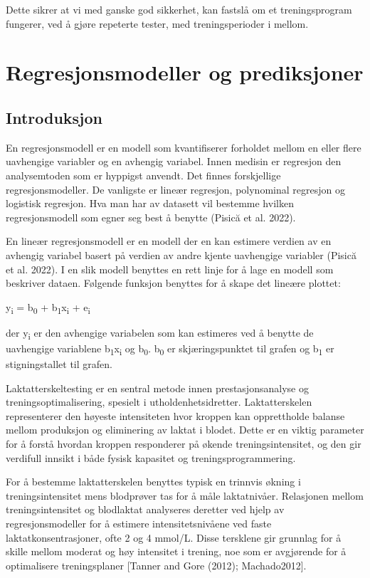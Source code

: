 \documentclass[
  letterpaper,
  DIV=11,
  numbers=noendperiod]{scrreprt}
\begin{document}
Dette sikrer at vi med ganske god sikkerhet, kan fastslå om et
treningsprogram fungerer, ved å gjøre repeterte tester, med
treningsperioder i mellom.


\chapter{Regresjonsmodeller og
prediksjoner}\label{regresjonsmodeller-og-prediksjoner}

\section{Introduksjon}\label{introduksjon-1}

En regresjonsmodell er en modell som kvantifiserer forholdet mellom en
eller flere uavhengige variabler og en avhengig variabel. Innen medisin
er regresjon den analysemtoden som er hyppigst anvendt. Det finnes
forskjellige regresjonsmodeller. De vanligste er lineær regresjon,
polynominal regresjon og logistisk regresjon. Hva man har av datasett
vil bestemme hvilken regresjonsmodell som egner seg best å benytte
(Pisică et al. 2022).

En lineær regresjonsmodell er en modell der en kan estimere verdien av
en avhengig variabel basert på verdien av andre kjente uavhengige
variabler (Pisică et al. 2022). I en slik modell benyttes en rett linje
for å lage en modell som beskriver dataen. Følgende funksjon benyttes
for å skape det lineære plottet:

y\textsubscript{i} = b\textsubscript{0} +
b\textsubscript{1}x\textsubscript{i} + e\textsubscript{i}

der y\textsubscript{i} er den avhengige variabelen som kan estimeres ved
å benytte de uavhengige variablene b\textsubscript{1}x\textsubscript{i}
og b\textsubscript{0}. b\textsubscript{0} er skjæringspunktet til grafen
og b\textsubscript{1} er stigningstallet til grafen.

Laktatterskeltesting er en sentral metode innen prestasjonsanalyse og
treningsoptimalisering, spesielt i utholdenhetsidretter. Laktatterskelen
representerer den høyeste intensiteten hvor kroppen kan opprettholde
balanse mellom produksjon og eliminering av laktat i blodet. Dette er en
viktig parameter for å forstå hvordan kroppen responderer på økende
treningsintensitet, og den gir verdifull innsikt i både fysisk kapasitet
og treningsprogrammering.

For å bestemme laktatterskelen benyttes typisk en trinnvis økning i
treningsintensitet mens blodprøver tas for å måle laktatnivåer.
Relasjonen mellom treningsintensitet og blodlaktat analyseres deretter
ved hjelp av regresjonsmodeller for å estimere intensitetsnivåene ved
faste laktatkonsentrasjoner, ofte 2 og 4 mmol/L. Disse tersklene gir
grunnlag for å skille mellom moderat og høy intensitet i trening, noe
som er avgjørende for å optimalisere treningsplaner {[}Tanner and Gore
(2012); Machado2012{]}.
\end{document}
